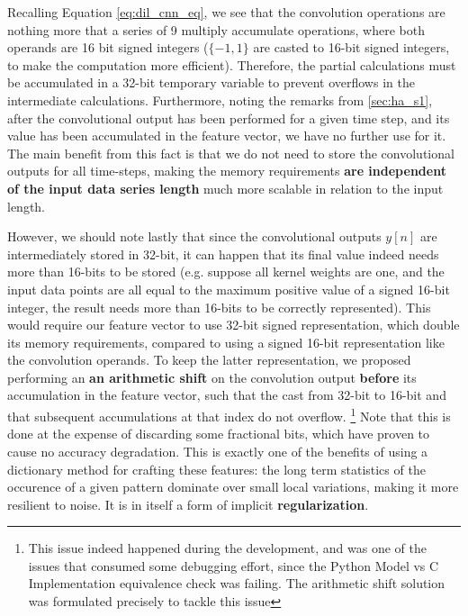         Recalling Equation \ref{eq:dil_cnn_eq}, we see that the convolution operations are nothing more that a series of 9 multiply accumulate operations, 
        where both operands are 16 bit signed integers ($\{-1,1\}$ are casted to 16-bit signed integers, to make the computation more efficient). Therefore, the partial calculations
        must be accumulated in a 32-bit temporary variable to prevent overflows in the intermediate calculations. Furthermore, noting the remarks from \ref{sec:ha_s1}, after the convolutional
        output has been performed for a given time step, and its value has been accumulated in the feature vector, we have no further use for it. The main benefit from this fact is that we do not 
        need to store the convolutional outputs for all time-steps, making the memory requirements \textbf{are independent of the input data series length} much more scalable in relation to the input length.

        However, we should note lastly that since the convolutional outputs $y[n]$ are intermediately stored in 32-bit, it can happen that its final value indeed needs more than 16-bits to be stored
        (e.g. suppose all kernel weights are one, and the input data points are all equal to the maximum positive value of a signed 16-bit integer, the result needs more than 16-bits to be correctly represented).
        This would require our feature vector to use 32-bit signed representation, which double its memory requirements, compared to using a signed 16-bit representation like the convolution operands. To keep the latter
        representation, we proposed performing an \textbf{an arithmetic shift} on the convolution output \textbf{before} its accumulation in the feature vector, such that the cast from 32-bit to 16-bit and that subsequent accumulations at that index do not overflow.
        \footnote{This issue indeed happened during the development, and was one of the issues that consumed some debugging effort, since the Python Model vs C Implementation equivalence check was failing. 
        The arithmetic shift solution was formulated precisely to tackle this issue}
        Note that this is done at the expense of discarding some fractional bits, which have proven to cause no accuracy degradation. This is exactly one of the benefits of using a dictionary method for crafting these features: the
        long term statistics of the occurence of a given pattern dominate over small local variations, making it more resilient to noise. It is in itself a form of implicit \textbf{regularization}.

